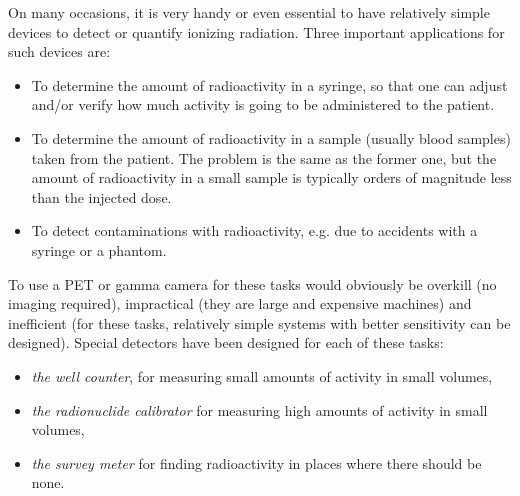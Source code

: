 \documentclass[11pt,oneside]{book}
\begin{document}
On many occasions, it is very handy or even essential to have
relatively simple devices to detect or quantify ionizing
radiation. Three important applications for such devices are:
\begin{itemize}
  \item To determine the amount of radioactivity in a syringe, so that
        one can adjust and/or verify how much activity is going to be
        administered to the patient.
  \item To determine the amount of radioactivity in a sample
        (usually blood samples) taken from the patient. The problem
        is the same as the former one, but the amount of radioactivity
        in a small sample is typically orders of magnitude less than
        the injected dose.
  \item To detect contaminations with radioactivity, e.g. due to
        accidents with a syringe or a phantom.
\end{itemize}
To use a PET or gamma camera for these tasks would obviously be
overkill (no imaging required), impractical (they are large and
expensive machines) and inefficient (for these tasks, relatively
simple systems with better sensitivity can be designed). Special
detectors have been designed for each of these tasks:
\begin{itemize}
  \item {\em the well counter}, for measuring small amounts of
        activity in small volumes,
  \item {\em the radionuclide calibrator} for measuring high amounts of
        activity in small volumes,
  \item {\em the survey meter} for finding radioactivity in places
        where there should be none.
\end{itemize}
\end{document}
